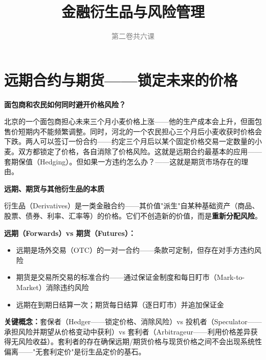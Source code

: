 \documentclass[a4paper,11pt]{ctexbook}
\title{\textcolor{themeblue}{\Huge\textbf{金融衍生品与风险管理}}}
\subtitle{\textcolor{gray}{第二卷\quad 共六课}}
\author{}
\date{}
\begin{document}
\maketitle
\thispagestyle{empty}
\tableofcontents
\newpage

\chapter{远期合约与期货——锁定未来的价格}

\begin{scenario}
\textbf{面包商和农民如何同时避开价格风险？}

北京的一个面包商担心未来三个月小麦价格上涨——他的生产成本会上升，但面包售价短期内不能频繁调整。同时，河北的一个农民担心三个月后小麦收获时价格会下跌。两人可以签订一份合约——约定三个月后以某个固定价格交易一定数量的小麦。双方都锁定了价格，各自消除了价格风险。这就是远期合约最基本的应用——套期保值（Hedging）。但如果一方违约怎么办？——这就是期货市场存在的理由。
\end{scenario}

\begin{qualitative}
\textbf{远期、期货与其他衍生品的本质}

衍生品（Derivatives）是一类金融合约——其价值"派生"自某种基础资产（商品、股票、债券、利率、汇率等）的价格。它们不创造新的价值，而是\textbf{重新分配风险}。

\textbf{远期（Forwards）vs 期货（Futures）：}
\begin{itemize}
  \item 远期是场外交易（OTC）的一对一合约——条款可定制，但存在对手方违约风险
  \item 期货是交易所交易的标准合约——通过保证金制度和每日盯市（Mark-to-Market）消除违约风险
  \item 远期在到期日结算一次；期货每日结算（逐日盯市）并追加保证金
\end{itemize}

\textbf{关键概念：}套保者（Hedger——锁定价格、消除风险）vs 投机者（Speculator——承担风险并期望从价格变动中获利）vs 套利者（Arbitrageur——利用价格差异获得无风险收益）。套利者的存在确保远期/期货价格与现货价格之间不会出现系统性偏离——"无套利定价"是衍生品定价的基石。
\end{qualitative}
\end{document}
